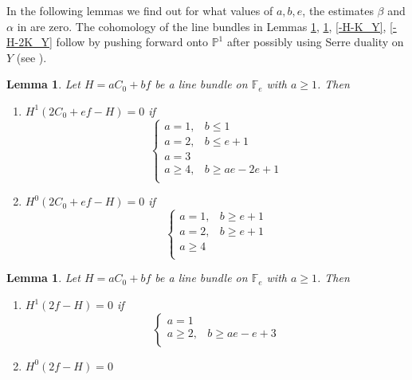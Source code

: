 \documentclass[11pt,twoside]{amsart}
\theoremstyle{plain}
\numberwithin{equation}{section}
\newtheorem{lemma}[theorem]{Lemma}
\theoremstyle{definition}
\begin{document}
In the following lemmas we find out for what values of $a, b, e$, the estimates $\beta$ and $\alpha$ in  are zero. The cohomology of the line bundles in Lemmas \ref{2C_0+ef-H}, \ref{2f-H}, \ref{-H-K_Y}, \ref{-H-2K_Y} follow by pushing forward onto $\mathbb{P}^1$ after possibly using Serre duality on $Y$ (see \cite[III, Ex $8.4$]{Hartshorne}).


\begin{lemma}\label{2C_0+ef-H}
Let $H = aC_0+bf$ be a line bundle on $\mathbb{F}_e$ with $a \geq 1$. Then 
\begin{enumerate}
    \item[(1)] $H^1(2C_0+ef-H) = 0$ if 
\[
\begin{cases}
   a = 1, & b \leq 1  \\
   a = 2, & b \leq e+1 \\
   a = 3 & \\
   a \geq 4, & b \geq ae-2e+1 \\
\end{cases}
\]

\item[(2)] $H^0(2C_0+ef-H) = 0$ if 
\[
\begin{cases}
   a = 1, & b \geq e+1  \\
   a = 2, & b \geq e+1 \\
   a \geq 4 & \\
\end{cases}
\] 

\end{enumerate}

    
\end{lemma}

\begin{lemma}\label{2f-H}
Let $H = aC_0+bf$ be a line bundle on $\mathbb{F}_e$ with $a \geq 1$. Then 
\begin{enumerate}
    \item[(1)] $H^1(2f-H) = 0$ if 
\[
\begin{cases}
   a = 1 &   \\
   a \geq 2, & b \geq ae-e+3 \\
   
\end{cases}
\]

\item[(2)] $H^0(2f-H) = 0$ 



\end{enumerate}  

\end{lemma}
\end{document}
